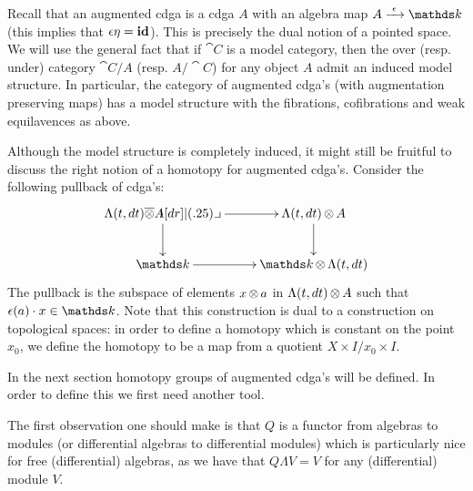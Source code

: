 
Recall that an augmented cdga is a cdga $A$ with an algebra map $A \tot{\counit} \k$ (this implies that $\epsilon \eta = \mathbf{id}$). This is precisely the dual notion of a pointed space. We will use the general fact that if $\cat{C}$ is a model category, then the over (resp. under) category $\cat{C} / A$ (resp. $A / \cat{C}$) for any object $A$ admit an induced model structure. In particular, the category of augmented cdga's (with augmentation preserving maps) has a model structure with the fibrations, cofibrations and weak equilavences as above.

Although the model structure is completely induced, it might still be fruitful to discuss the right notion of a homotopy for augmented cdga's. Consider the following pullback of cdga's:
\[ \xymatrix{
	\Lambda(t, dt) \overline{\tensor} A \ar[r] \xypb \ar[d] & \Lambda(t, dt) \tensor A \ar[d] \\
	\k \ar[r] & \k \tensor \Lambda(t, dt)
}\]
The pullback is the subspace of elements $x \operatorname*{\otimes} a$ in $\Lambda(t, dt) \operatorname*{\otimes} A$ such that $\counit(a) \cdot x \in \k$. Note that this construction is dual to a construction on topological spaces: in order to define a homotopy which is constant on the point $x_0$, we define the homotopy to be a map from a quotient ${X \times I} / {x_0 \times I}$.

In the next section homotopy groups of augmented cdga's will be defined. In order to define this we first need another tool.

The first observation one should make is that $Q$ is a functor from algebras to modules (or differential algebras to differential modules) which is particularly nice for free (differential) algebras, as we have that $Q \Lambda V = V$ for any (differential) module $V$.

